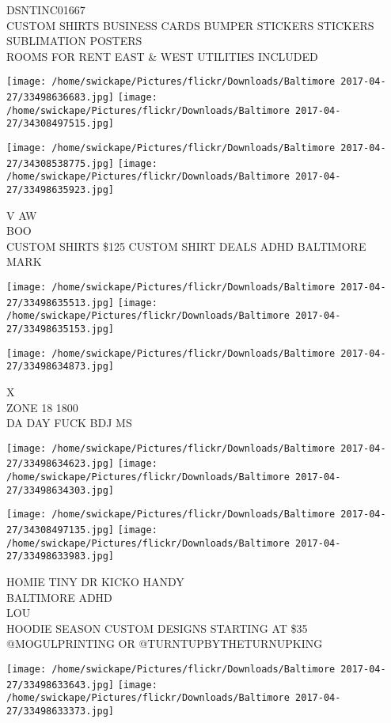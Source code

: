 \documentclass[10pt,letterpaper]{article}
\begin{document}
DSNTINC01667\\
CUSTOM SHIRTS BUSINESS CARDS BUMPER STICKERS STICKERS SUBLIMATION POSTERS\\
ROOMS FOR RENT EAST \& WEST UTILITIES INCLUDED
\pagebreak

\texttt{[image: /home/swickape/Pictures/flickr/Downloads/Baltimore 2017-04-27/33498636683.jpg]}
\texttt{[image: /home/swickape/Pictures/flickr/Downloads/Baltimore 2017-04-27/34308497515.jpg]}

\texttt{[image: /home/swickape/Pictures/flickr/Downloads/Baltimore 2017-04-27/34308538775.jpg]}
\texttt{[image: /home/swickape/Pictures/flickr/Downloads/Baltimore 2017-04-27/33498635923.jpg]}

V AW\\
BOO\\
CUSTOM SHIRTS \$125 CUSTOM SHIRT DEALS ADHD BALTIMORE\\
MARK
\pagebreak

\texttt{[image: /home/swickape/Pictures/flickr/Downloads/Baltimore 2017-04-27/33498635513.jpg]}
\texttt{[image: /home/swickape/Pictures/flickr/Downloads/Baltimore 2017-04-27/33498635153.jpg]}

\vspace{0.25in}
\texttt{[image: /home/swickape/Pictures/flickr/Downloads/Baltimore 2017-04-27/33498634873.jpg]}

X\\
ZONE 18 1800\\
DA DAY FUCK BDJ MS
\pagebreak

\texttt{[image: /home/swickape/Pictures/flickr/Downloads/Baltimore 2017-04-27/33498634623.jpg]}
\texttt{[image: /home/swickape/Pictures/flickr/Downloads/Baltimore 2017-04-27/33498634303.jpg]}

\texttt{[image: /home/swickape/Pictures/flickr/Downloads/Baltimore 2017-04-27/34308497135.jpg]}
\texttt{[image: /home/swickape/Pictures/flickr/Downloads/Baltimore 2017-04-27/33498633983.jpg]}

HOMIE TINY DR  KICKO HANDY\\
BALTIMORE ADHD\\
LOU\\
HOODIE SEASON CUSTOM DESIGNS STARTING AT \$35 @MOGULPRINTING OR @TURNTUPBYTHETURNUPKING
\pagebreak

\texttt{[image: /home/swickape/Pictures/flickr/Downloads/Baltimore 2017-04-27/33498633643.jpg]}
\texttt{[image: /home/swickape/Pictures/flickr/Downloads/Baltimore 2017-04-27/33498633373.jpg]}
\end{document}
